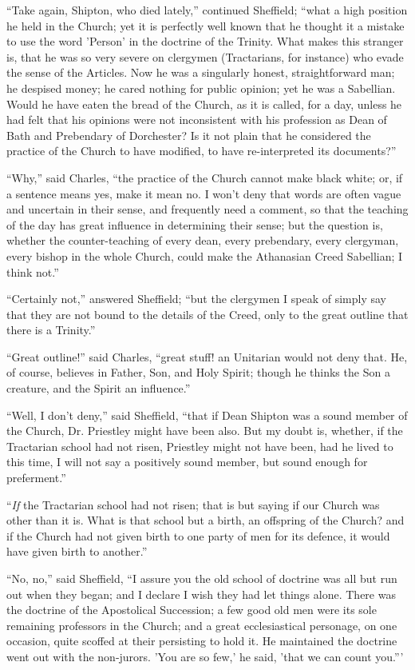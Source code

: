 ``Take again, Shipton, who died lately,'' continued
Sheffield; ``what a high position he held in the Church; yet it is
perfectly well known that he thought it a mistake to use the word
'Person' in the doctrine of the Trinity. What makes this stranger is,
that he was so very severe on clergymen (Tractarians, for instance)
who evade the sense of the Articles. Now he was a singularly honest,
straightforward man; he despised money; he cared nothing for public
opinion; yet he was a Sabellian. Would he have eaten the bread of the
Church, as it is called, for a day, unless he had felt that his
opinions were not inconsistent with his profession as Dean of Bath and
Prebendary of Dorchester? Is it not plain that he considered the
practice of the Church to have modified, to have re-interpreted its
documents?''

``Why,'' said Charles, ``the practice of the Church
cannot make black white; or, if a sentence means yes, make it mean no.
I won't deny that words are often vague and uncertain in their sense,
and frequently need a comment, so that the teaching of the day has
great influence in determining their sense; but the question is,
whether the counter-teaching of every dean, every prebendary, every
clergyman, every bishop in the whole Church, could make the Athanasian
Creed Sabellian; I think not.''

``Certainly not,'' answered Sheffield; ``but the
clergymen I speak of simply say that they are not bound to the details
of the Creed, only to the great outline that there is a Trinity.''

``Great outline!'' said Charles, ``great stuff! an
Unitarian would not deny that. He, of course, believes in Father, Son,
and Holy Spirit; though he thinks the Son a creature, and the Spirit
an influence.''

``Well, I don't deny,'' said Sheffield, ``that if Dean
Shipton was a sound member of the Church, Dr. Priestley might have
been also. But my doubt is, whether, if the Tractarian school had not
risen, Priestley might not have been, had he lived to this time, I
will not say a positively sound member, but sound enough for
preferment.''

``\emph{If} the Tractarian school had not risen; that is but saying if
our Church was other than it is. What is that school but a birth, an
offspring of the Church? and if the Church had not given birth to one
party of men for its defence, it would have given birth to
another.''

``No, no,'' said Sheffield, ``I assure you the old
school of doctrine was all but run out when they began; and I declare
I wish they had let things alone. There was the doctrine of the
Apostolical Succession; a few good old men were its sole remaining
professors in the Church; and a great ecclesiastical personage, on one
occasion, quite scoffed at their persisting to hold it. He maintained
the doctrine went out with the non-jurors. 'You are so few,' he said,
'that we can count you.'''

